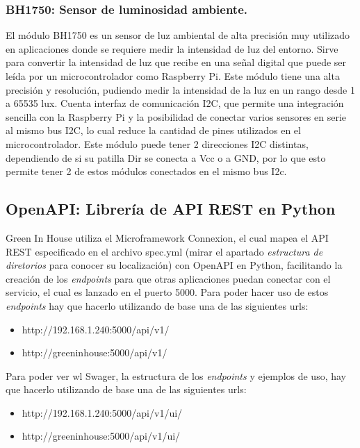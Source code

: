         \subsubsection{BH1750: Sensor de luminosidad ambiente.}  
        El módulo BH1750 es un sensor de luz ambiental de alta precisión muy utilizado en aplicaciones donde se requiere medir la intensidad de luz del entorno. Sirve para convertir la intensidad de luz que recibe en una señal digital que puede ser leída por un microcontrolador como Raspberry Pi.
        Este módulo tiene una alta precisión y resolución, pudiendo medir la intensidad de la luz en un rango desde 1 a 65535 lux. 
        Cuenta interfaz de comunicación I2C, que permite una integración sencilla con la Raspberry Pi y la posibilidad de conectar varios sensores en serie al mismo bus I2C, lo cual reduce la cantidad de pines utilizados en el microcontrolador. Este módulo puede tener 2 direcciones I2C distintas, dependiendo de si su patilla Dir se conecta a Vcc o a GND, por lo que esto permite tener 2 de estos módulos conectados en el mismo bus I2c.

    \subsection{OpenAPI: Librería de API REST en Python}
    Green In House utiliza el Microframework Connexion, el cual mapea el API REST especificado en el archivo spec.yml (mirar el apartado \textit{estructura de diretorios} para conocer su localización) con OpenAPI \cite{wiki:openapi} en Python, facilitando la creación de los \textit{endpoints} para que otras aplicaciones puedan conectar con el servicio, el cual es lanzado en el puerto 5000. Para poder hacer uso de estos \textit{endpoints} hay que hacerlo utilizando de base una de las siguientes urls: 
    \begin{itemize}
        \item http://192.168.1.240:5000/api/v1/
        \item http://greeninhouse:5000/api/v1/
    \end{itemize}
    Para poder ver wl Swager, la estructura de los \textit{endpoints} y ejemplos de uso, hay que hacerlo utilizando de base una de las siguientes urls: 
    \begin{itemize}
        \item http://192.168.1.240:5000/api/v1/ui/
        \item http://greeninhouse:5000/api/v1/ui/
    \end{itemize}

